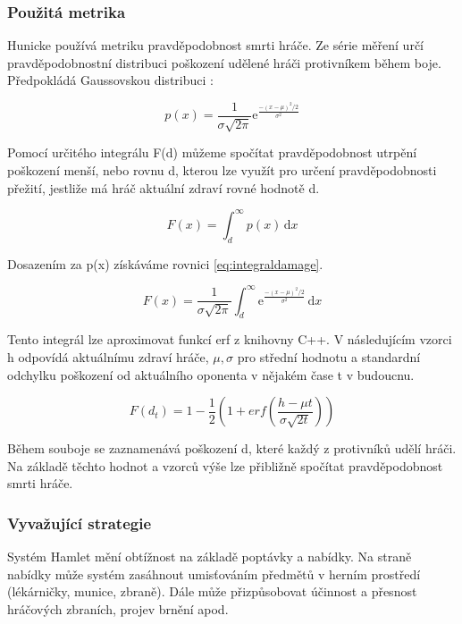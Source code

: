 \subsubsection{Použitá metrika}

Hunicke používá metriku pravděpodobnost smrti hráče. Ze série měření určí pravděpodobnostní distribuci poškození udělené hráči protivníkem během boje. Předpokládá Gaussovskou distribuci :

\begin{equation}
	   p(x)=\frac{1}{\sigma\sqrt{2\pi}}\mathrm{e}^{\frac{-(x-\mu)^2/2}{\sigma^2}}
\end{equation}

Pomocí určitého integrálu F(d) můžeme spočítat pravděpodobnost utrpění poškození menší, nebo rovnu d, kterou lze využít pro určení pravděpodobnosti přežití, jestliže má hráč aktuální zdraví rovné hodnotě d.

\begin{equation}
	   F(x) = \int_d^\infty p(x)\,\mathrm{d}x
\end{equation}

Dosazením za p(x) získáváme rovnici \ref{eq:integraldamage}.

\begin{equation} \label{eq:integraldamage}
	   F(x) = \frac{1}{\sigma\sqrt{2\pi}}\int_d^\infty \mathrm{e}^{\frac{-(x-\mu)^2/2}{\sigma^2}}\,\mathrm{d}x
\end{equation}

Tento integrál lze aproximovat funkcí erf z knihovny C++. V následujícím vzorci h odpovídá aktuálnímu zdraví hráče, $\mu, \sigma$ pro střední hodnotu a standardní odchylku poškození od aktuálního oponenta v nějakém čase t v budoucnu.

\begin{equation}
	   F(d_t) = 1-\frac{1}{2}(1+erf(\frac{h-\mu t}{\sigma\sqrt{2t}}))
\end{equation}

Během souboje se zaznamenává poškození d, které každý z protivníků udělí hráči. Na základě těchto hodnot a vzorců výše lze přibližně spočítat pravděpodobnost smrti hráče.

\subsubsection{Vyvažující strategie}

Systém Hamlet mění obtížnost na základě poptávky a nabídky. Na straně nabídky může systém zasáhnout umisťováním předmětů v herním prostředí (lékárničky, munice, zbraně). Dále může přizpůsobovat účinnost a přesnost hráčových zbraních, projev brnění apod.

